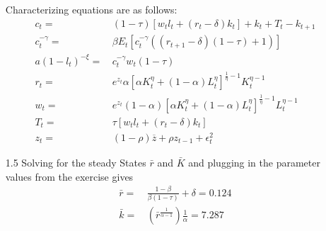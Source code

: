\documentclass[letterpaper,12pt]{article}
\theoremstyle{definition}
\begin{document}
\begin{enumerate}
Characterizing equations are as follows:
\begin{align*}
c_t =&\, (1 - \tau) [w_t l_t + (r_t - \delta) k_t] + k_t + T_t - k_{t+1} \\
c_t^{- \gamma} =&\, \beta E_t[ c_t^{- \gamma} (( r_{t+1} - \delta )(1 - \tau) + 1)]\\
a(1 - l_t)^{- \xi} = &\,c_t^{- \gamma} w_t (1 - \tau)\\
r_t = &\,e^{z_t} \alpha [\alpha K_t^{\eta} + (1 - \alpha) L_t^{\eta}]^{\frac{1}{\eta}-1} K_t^{\eta - 1}\\
w_t = &\,e^{z_t} (1 - \alpha) [\alpha K_t^{\eta} + (1 - \alpha) L_t^{\eta}]^{\frac{1}{\eta}-1} L_t^{\eta - 1}\\
T_t  = &\,\tau [w_tl_t + (r_t - \delta) k_t]\\
z_t = &\,(1 - \rho)\overline{z} + \rho z_{t-1} + \epsilon_t^2 
\end{align*}
\item[1.5]
Solving for the steady States $\bar{r}$ and $\bar{K}$ and plugging in the parameter values from the exercise gives
\begin{align*}
\bar{r} =&\, \frac{1-\beta}{\beta(1-\tau)}+\delta = 0.124\\
\bar{k} = &\, \left( \bar{r}^{\frac{1}{\alpha - 1}} \right)\frac{1}{\alpha}=7.287
\end{align*}


\end{enumerate}
\end{document}
